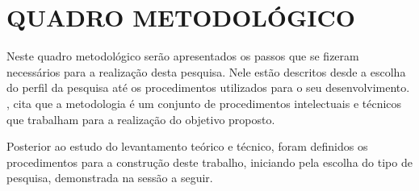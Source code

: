 
\chapter{QUADRO METODOLÓGICO}
\label{cap:quadroMetodologico}


\par Neste quadro metodológico serão apresentados os passos que se fizeram necessários para a realização desta pesquisa. Nele estão descritos desde a escolha do perfil da pesquisa até os procedimentos utilizados para o seu desenvolvimento. , cita que a metodologia é um conjunto de procedimentos intelectuais e técnicos que trabalham para a realização do objetivo proposto.
\par Posterior ao estudo do levantamento teórico e técnico, foram definidos os procedimentos para a construção deste trabalho, iniciando pela escolha do tipo de pesquisa, demonstrada na sessão a seguir.







%



%

%



%

%